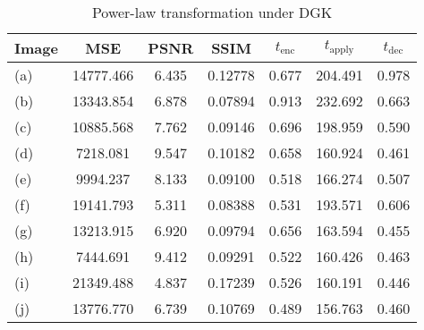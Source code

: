 \begin{table}[t]
	\centering
	\caption{Power-law transformation under DGK}
	\label{tbl:pwr-dgk}
    \begin{tabular}{lcccccc}
        \hline
        Image & MSE  & PSNR & SSIM & $t_\text{enc}$ & $t_\text{apply}$ & $t_\text{dec}$ \\ \hline
		(a) & 14777.466 & 6.435 & 0.12778 & 0.677 & 204.491 & 0.978 \\
		(b) & 13343.854 & 6.878 & 0.07894 & 0.913 & 232.692 & 0.663 \\
		(c) & 10885.568 & 7.762 & 0.09146 & 0.696 & 198.959 & 0.590 \\
		(d) & 7218.081 & 9.547 & 0.10182 & 0.658 & 160.924 & 0.461 \\
		(e) & 9994.237 & 8.133 & 0.09100 & 0.518 & 166.274 & 0.507 \\
		(f) & 19141.793 & 5.311 & 0.08388 & 0.531 & 193.571 & 0.606 \\
		(g) & 13213.915 & 6.920 & 0.09794 & 0.656 & 163.594 & 0.455 \\
		(h) & 7444.691 & 9.412 & 0.09291 & 0.522 & 160.426 & 0.463 \\
		(i) & 21349.488 & 4.837 & 0.17239 & 0.526 & 160.191 & 0.446 \\
		(j) & 13776.770 & 6.739 & 0.10769 & 0.489 & 156.763 & 0.460 \\
		\hline
    \end{tabular}
\end{table}
